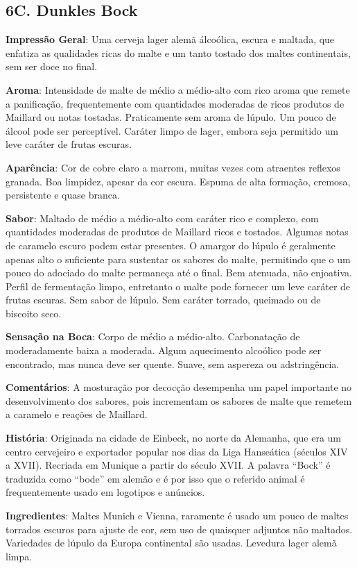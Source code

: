 \subsection*{6C. Dunkles Bock}
\textbf{Impressão Geral}: Uma cerveja lager alemã álcoólica, escura e maltada, que enfatiza as qualidades ricas do malte e um tanto tostado dos maltes continentais, sem ser doce no final.

\textbf{Aroma}: Intensidade de malte de médio a médio-alto com rico aroma que remete a panificação, frequentemente com quantidades moderadas de ricos produtos de Maillard ou notas tostadas. Praticamente sem aroma de lúpulo. Um pouco de álcool pode ser perceptível. Caráter limpo de lager, embora seja permitido um leve caráter de frutas escuras.

\textbf{Aparência}: Cor de cobre claro a marrom, muitas vezes com atraentes reflexos granada. Boa limpidez, apesar da cor escura. Espuma de alta formação, cremosa, persistente e quase branca.

\textbf{Sabor}: Maltado de médio a médio-alto com caráter rico e complexo, com quantidades moderadas de produtos de Maillard ricos e tostados. Algumas notas de caramelo escuro podem estar presentes. O amargor do lúpulo é geralmente apenas alto o suficiente para sustentar os sabores do malte, permitindo que o um pouco do adociado do malte permaneça até o final. Bem atenuada, não enjoativa. Perfil de fermentação limpo, entretanto o malte pode fornecer um leve caráter de frutas escuras. Sem sabor de lúpulo. Sem caráter torrado, queimado ou de biscoito seco.

\textbf{Sensação na Boca}: Corpo de médio a médio-alto. Carbonatação de moderadamente baixa a moderada. Algum aquecimento alcoólico pode ser encontrado, mas nunca deve ser quente. Suave, sem aspereza ou adstringência.

\textbf{Comentários}: A mosturação por decocção desempenha um papel importante no desenvolvimento dos sabores, pois incrementam os sabores de malte que remetem a caramelo e reações de Maillard.

\textbf{História}: Originada na cidade de Einbeck, no norte da Alemanha, que era um centro cervejeiro e exportador popular nos dias da Liga Hanseática (séculos XIV a XVII). Recriada em Munique a partir do século XVII. A palavra “Bock” é traduzida como “bode” em alemão e é por isso que o referido animal é frequentemente usado em logotipos e anúncios.

\textbf{Ingredientes}: Maltes Munich e Vienna, raramente é usado um pouco de maltes torrados escuros para ajuste de cor, sem uso de quaisquer adjuntos não maltados. Variedades de lúpulo da Europa continental são usadas. Levedura lager alemã limpa.

